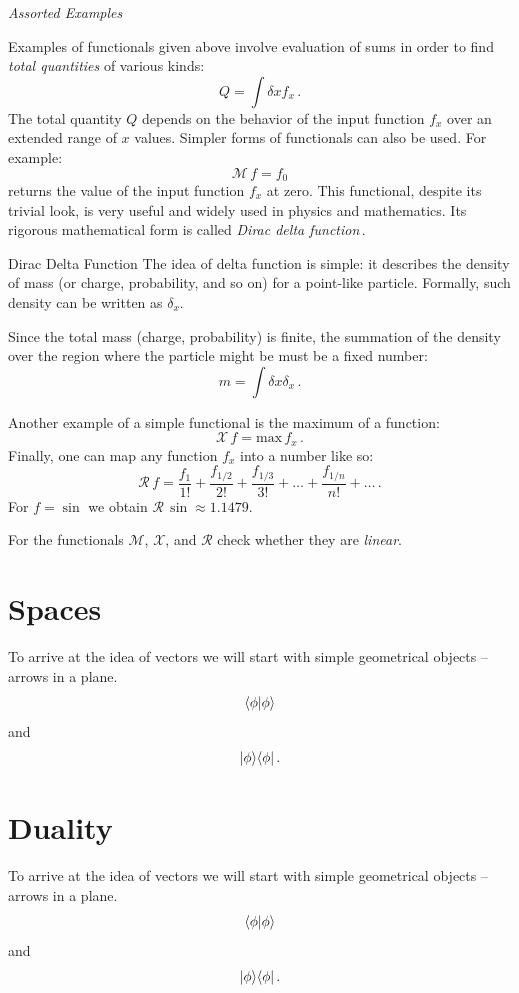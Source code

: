 \begin{flushleft}
	{\it Assorted Examples}
\end{flushleft}
Examples of functionals given above involve evaluation of sums in order to find  \emph{total quantities} of various kinds:
\[
Q = \int \delta x f_x\,.
\]
The total quantity $Q$ depends on the behavior of the input function $f_x$ over an extended range of $x$ values. Simpler forms of functionals can also be used. For example:
\[
\mathcal{M}\, f = f_0
\]
returns the value of the input function $f_x$ at zero. This functional, despite its trivial look, is very useful and widely used in physics and mathematics. Its rigorous mathematical form is called \emph{Dirac delta function}\,.
\begin{mybio}{Dirac Delta Function}
	The idea of delta function is simple: it describes the density of mass (or charge, probability, and so on) for a point-like particle. Formally, such density can be written as $\delta_x$.
	
	Since the total mass (charge, probability) is finite, the summation of the density over the region where the particle might be must be a fixed number:
	\[
	m = \int \delta x \delta_x\,.
	\]
\end{mybio}

Another example of a simple functional is the maximum of a function:
\[
\mathcal{X}\,f = \textrm{max}\,f_x\,.
\]
Finally, one can map any function $f_x$ into a number like so:
\[
\mathcal{R}\,f = \frac{f_1}{1!} + \frac{f_{1/2}}{2!} + \frac{f_{1/3}}{3!}+\ldots+\frac{f_{1/n}}{n!}+\ldots\,.
\]
For $f=\sin$ we obtain $\mathcal{R}\,\sin\approx 1.1479$.
\begin{exercise}
	For the functionals $\mathcal{M}$, $\mathcal{X}$, and $\mathcal{R}$ check whether they are \emph{linear}.
\end{exercise}

\section{Spaces}

To arrive at the idea of vectors we will start with simple geometrical
objects -- arrows in a plane.
\[
\langle{\phi}|{\phi\rangle}
\]
and
\[
|{\phi}\rangle\langle{\phi}|\,.
\]

\section{Duality}

To arrive at the idea of vectors we will start with simple geometrical
objects -- arrows in a plane.
\[
\langle{\phi}|{\phi\rangle}
\]
and
\[
|{\phi}\rangle\langle{\phi}|\,.
\]


